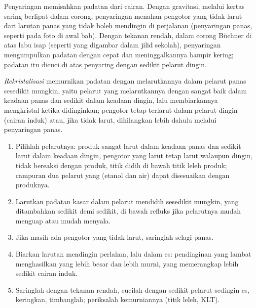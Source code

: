 Penyaringan memisahkan padatan dari cairan. Dengan gravitasi, melalui
kertas saring berlipat dalam corong, penyaringan menahan pengotor yang
tidak larut dari larutan panas yang tidak boleh mendingin di perjalanan
(penyaringan panas, seperti pada foto di awal bab). Dengan tekanan
rendah, dalam corong Büchner di atas labu isap (seperti yang digambar
dalam jilid sekolah), penyaringan mengumpulkan padatan dengan cepat dan
meninggalkannya hampir kering; padatan itu dicuci di atas penyaring
dengan sedikit pelarut dingin.

\begin{definition}[Rekristalisasi]\label{def:b1:lab-techniques-1:recrystallisation}
\emph{Rekristalisasi} memurnikan padatan dengan
melarutkannya dalam pelarut panas sesedikit mungkin, yaitu pelarut yang
melarutkannya dengan sangat baik dalam keadaan panas dan sedikit dalam
keadaan dingin, lalu membiarkannya mengkristal ketika didinginkan;
pengotor tetap terlarut dalam pelarut dingin (cairan induk) atau, jika
tidak larut, dihilangkan lebih dahulu melalui penyaringan panas.
\end{definition}

\begin{method}\label{met:b1:lab-techniques-1:recrystallise}
\begin{enumerate}
  \item Pilihlah pelarutnya: produk sangat larut dalam keadaan panas dan
        sedikit larut dalam keadaan dingin, pengotor yang larut tetap
        larut walaupun dingin, tidak bereaksi dengan produk, titik didih
        di bawah titik leleh produk; campuran dua pelarut yang  (etanol dan air) dapat disesuaikan dengan produknya.
  \item Larutkan padatan kasar dalam pelarut mendidih sesedikit mungkin,
        yang ditambahkan sedikit demi sedikit, di bawah refluks jika
        pelarutnya mudah menguap atau mudah menyala.
  \item Jika masih ada pengotor yang tidak larut, saringlah selagi panas.
  \item Biarkan larutan mendingin perlahan, lalu dalam es: pendinginan
        yang lambat menghasilkan  yang lebih besar dan lebih
        murni, yang memerangkap lebih sedikit cairan induk.
  \item Saringlah dengan tekanan rendah, cucilah dengan sedikit pelarut
        sedingin es, keringkan, timbanglah; periksalah kemurniannya
        (titik leleh, KLT).
\end{enumerate}
\end{method}

